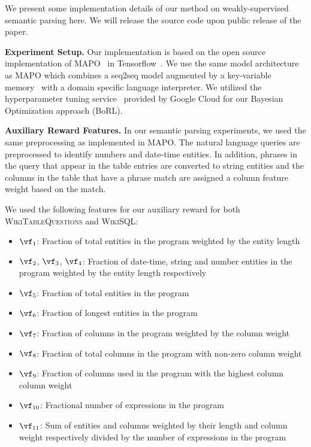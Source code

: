 We present some implementation details of our method on
weakly-supervised semantic parsing here. We will release the source
code upon public release of the paper.

{\bf Experiment Setup.} Our implementation is based on the open
source implementation of MAPO~\cite{NIPS2018_8204} in
Tensorflow~\cite{abadi2016tensorflow}.  We use the same model
architecture as MAPO which combines a seq2seq model augmented by a
key-variable memory~\cite{liang2017nsm} with a domain specific
language interpreter. We utilized the hyperparameter tuning
service~\cite{golovin2017google} provided by Google Cloud for our
Bayesian Optimization approach (BoRL).

{\bf Auxiliary Reward Features.}
In our semantic parsing experiments, we used the same preprocessing as implemented in MAPO.
The natural language queries are preprocessed to identify numbers and date-time entities. In addition,
phrases in the query that appear in the table entries are converted to string entities and the columns
in the table that have a phrase match are assigned a column feature weight based on the match.

We used the following features for our auxiliary reward for both \textsc{WikiTableQuestions} and \textsc{WikiSQL}:
\begin{itemize}
	\itemsep-0.5em
	\item $\vf_1$: Fraction of total entities in the program weighted by the entity length
	\item $\vf_2$, $\vf_3$, $\vf_4$: Fraction of date-time, string and number entities in the program weighted by the entity length respectively
	\item $\vf_5$: Fraction of total entities in the program
	\item $\vf_6$: Fraction of longest entities in the program
	\item $\vf_7$: Fraction of columns in the program weighted by the column weight
	\item $\vf_8$: Fraction of total columns in the program with non-zero column weight
	\item $\vf_9$: Fraction of columns used in the program with the highest column column weight
	\item $\vf_{10}$: Fractional number of expressions in the program
	\item $\vf_{11}$: Sum of entities and columns weighted by their length and column weight respectively divided by the number of expressions in the program
\end{itemize}


